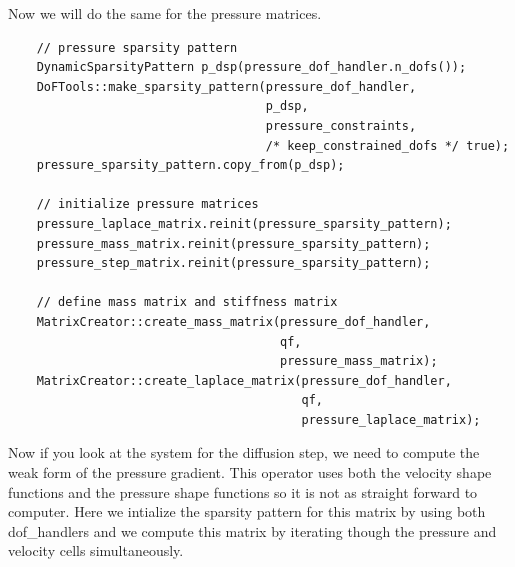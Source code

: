 \documentclass{article}
\begin{document}
Now we will do the same for the pressure matrices.
\begin{lstlisting}
    // pressure sparsity pattern
    DynamicSparsityPattern p_dsp(pressure_dof_handler.n_dofs());
    DoFTools::make_sparsity_pattern(pressure_dof_handler,
                                    p_dsp,
                                    pressure_constraints,
                                    /* keep_constrained_dofs */ true);
    pressure_sparsity_pattern.copy_from(p_dsp);

    // initialize pressure matrices
    pressure_laplace_matrix.reinit(pressure_sparsity_pattern);
    pressure_mass_matrix.reinit(pressure_sparsity_pattern);
    pressure_step_matrix.reinit(pressure_sparsity_pattern);

    // define mass matrix and stiffness matrix
    MatrixCreator::create_mass_matrix(pressure_dof_handler,
                                      qf,
                                      pressure_mass_matrix);
    MatrixCreator::create_laplace_matrix(pressure_dof_handler,
                                         qf,
                                         pressure_laplace_matrix);
\end{lstlisting}
Now if you look at the system for the diffusion step, we need to compute the weak form of the pressure gradient. This operator uses both the velocity shape functions and the pressure shape functions so it is not as straight forward to computer. Here we intialize the sparsity pattern for this matrix by using both dof\_handlers and we compute this matrix by iterating though the pressure and velocity cells simultaneously.
\end{document}
